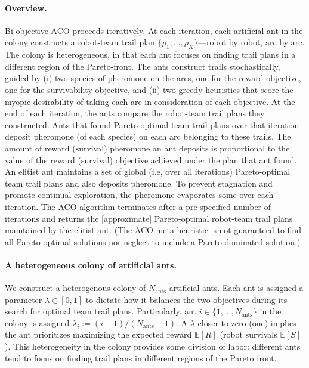 \documentclass[11pt, oneside]{article}
\begin{document}
\paragraph{Overview.}
Bi-objective ACO proceeds iteratively. 
At each iteration, each artificial ant in the colony constructs a robot-team trail plan $\{\rho_1, ..., \rho_K\}$---robot by robot, arc by arc.
The colony is heterogeneous, in that each ant focuses on finding trail plans in a different region of the Pareto-front.
The ants construct trails stochastically, guided by (i) two species of pheromone on the arcs, one for the reward objective, one for the survivability objective, and (ii) two greedy heuristics that score the myopic desirability of taking each arc in consideration of each objective. 
At the end of each iteration, the ants compare the robot-team trail plans they constructed. 
Ants that found Pareto-optimal team trail plans over that iteration deposit pheromone (of each species) on each arc belonging to these trails. The amount of reward (survival) pheromone an ant deposits is proportional to the value of the reward (survival) objective achieved under the plan that ant found.
An elitist ant maintains a set of global (i.e, over all iterations) Pareto-optimal team trail plans and also deposits pheromone.
To prevent stagnation and promote continual exploration, the pheromone evaporates some over each iteration.
The ACO algorithm terminates after a pre-specified number of iterations and returns the [approximate] Pareto-optimal robot-team trail plans maintained by the elitist ant. 
(The ACO meta-heuristic is not guaranteed to find all Pareto-optimal solutions nor neglect to include a Pareto-dominated solution.)

\paragraph{A heterogeneous colony of artificial ants.}
We construct a heterogenous colony of $N_{\text{ants}}$ artificial ants.
Each ant is assigned a parameter $\lambda \in [0, 1]$ to dictate how it balances the two objectives during its search for optimal team trail plans. Particularly, ant $i\in\{1, ..., N_{\text{ants}}\}$ in the colony is assigned $\lambda_i := (i-1) / (N_{\text{ants}}-1)$.
A $\lambda$ closer to zero (one) implies the ant prioritizes maximizing the expected reward $\mathbb{E}[R]$ (robot survivals $\mathbb{E}[S]$). This heterogeneity in the colony provides some division of labor: different ants tend to focus on finding trail plans in different regions of the Pareto front. 
\end{document}
